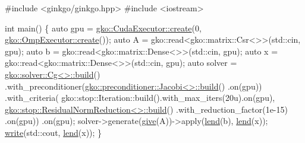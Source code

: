 \begin{DoxyCodeInclude}
\textcolor{preprocessor}{#include <ginkgo/ginkgo.hpp>}
\textcolor{preprocessor}{#include <iostream>}

\textcolor{keywordtype}{int} main()
\{
    \textcolor{keyword}{auto} gpu = \hyperlink{classgko_1_1CudaExecutor_a2718a92034350650ef406ffdb60db090}{gko::CudaExecutor::create}(0, 
      \hyperlink{classgko_1_1OmpExecutor_a33ca05fdd0fc928ee262fc9425304874}{gko::OmpExecutor::create}());
    \textcolor{keyword}{auto} A = gko::read<gko::matrix::Csr<>>(std::cin, gpu);
    \textcolor{keyword}{auto} b = gko::read<gko::matrix::Dense<>>(std::cin, gpu);
    \textcolor{keyword}{auto} x = gko::read<gko::matrix::Dense<>>(std::cin, gpu);
    \textcolor{keyword}{auto} solver =
        \hyperlink{classgko_1_1solver_1_1Cg}{gko::solver::Cg<>::build}()
            .with\_preconditioner(\hyperlink{classgko_1_1preconditioner_1_1Jacobi}{gko::preconditioner::Jacobi<>::build}()
      .on(gpu))
            .with\_criteria(
                gko::stop::Iteration::build().with\_max\_iters(20u).on(gpu),
                \hyperlink{classgko_1_1stop_1_1ResidualNormReduction}{gko::stop::ResidualNormReduction<>::build}()
                    .with\_reduction\_factor(1e-15)
                    .on(gpu))
            .on(gpu);
    solver->generate(\hyperlink{namespacegko_acbd3fd6d07e498892881e8e2ab0b4167}{give}(A))->apply(\hyperlink{namespacegko_aa8cb4876b72e5e1036ea9575443c439b}{lend}(b), \hyperlink{namespacegko_aa8cb4876b72e5e1036ea9575443c439b}{lend}(x));
    \hyperlink{namespacegko_a859dc47a462721d83728d91ab7fa2148}{write}(std::cout, \hyperlink{namespacegko_aa8cb4876b72e5e1036ea9575443c439b}{lend}(x));
\}
\end{DoxyCodeInclude}
 
